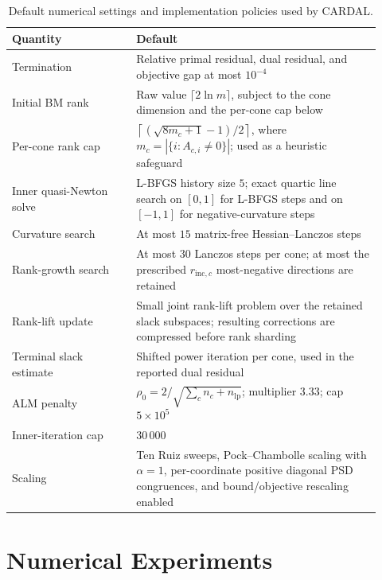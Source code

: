 \documentclass[11pt]{article}
\theoremstyle{definition}
\theoremstyle{remark}
\newcommand{\name}{\textsc{CARDAL}\xspace}
\begin{document}
\begin{table}[H]
\centering
\caption{Default numerical settings and implementation policies used by
\name{}.}
\label{tab:solver-defaults}
\begin{tabular}{p{0.31\linewidth}p{0.61\linewidth}}
\hline
Quantity & Default \\
\hline
Termination
  & Relative primal residual, dual residual, and objective gap at most
  $10^{-4}$\\
Initial BM rank
  & Raw value $\lceil 2\ln m\rceil$, subject to the cone dimension
    and the per-cone cap below \\
Per-cone rank cap
  & $\left\lceil(\sqrt{8m_c+1}-1)/2\right\rceil$, where
    $m_c=|\{i:A_{c,i}\neq0\}|$; used as a heuristic safeguard \\
Inner quasi-Newton solve
  & L-BFGS history size $5$; exact quartic line search on $[0,1]$ for
    L-BFGS steps and on $[-1,1]$ for negative-curvature steps \\
Curvature search
  & At most $15$ matrix-free Hessian--Lanczos steps \\
Rank-growth search
  & At most $30$ Lanczos steps per cone; at most the prescribed
    $r_{\mathrm{inc},c}$ most-negative directions are retained \\
Rank-lift update
  & Small joint rank-lift problem over the retained slack subspaces;
    resulting corrections are compressed before rank sharding \\
Terminal slack estimate
  & Shifted power iteration per cone, used in the reported dual residual \\
ALM penalty
  & $\rho_0=2/\sqrt{\sum_c n_c+n_{\mathrm{lp}}}$; multiplier $3.33$;
    cap $5\times10^5$ \\
Inner-iteration cap
  & $30\,000$ \\
Scaling
  & Ten Ruiz sweeps, Pock--Chambolle scaling with $\alpha=1$, per-coordinate
    positive diagonal PSD congruences, and bound/objective rescaling enabled \\
\hline
\end{tabular}
\end{table}


\section{Numerical Experiments}
\label{sec:experiments}
\end{document}
